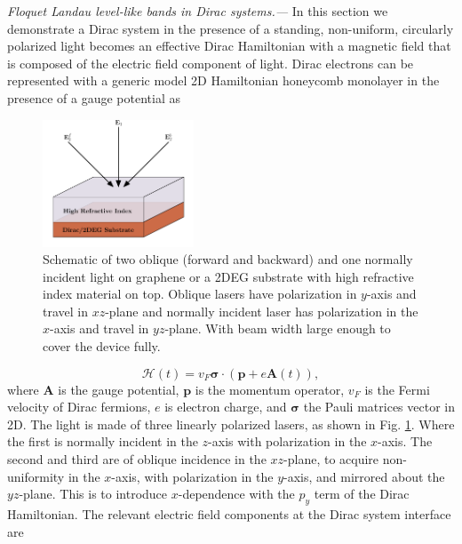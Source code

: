 \documentclass[aps,prb,twocolumn,showpacs,superscriptaddress]{revtex4-2}
\renewcommand{\vec}[1]{\mathbf{#1}}
\newcommand{\ham}{\mathcal{H}}
\begin{document}
\emph{Floquet Landau level-like bands in Dirac systems.---} In this section we demonstrate a Dirac system in the presence of a standing, non-uniform, circularly polarized light becomes an effective Dirac Hamiltonian with a magnetic field that is composed of the electric field component of light.
Dirac electrons can be represented with a generic model 2D Hamiltonian honeycomb monolayer in the presence of a gauge potential as

\begin{figure}[h]
  \includegraphics[width=0.4\textwidth]{./figures/fll-setup.pdf}
  \caption{Schematic of two oblique (forward and backward) and one normally incident light on graphene or a 2DEG substrate with high refractive index material on top. Oblique lasers have polarization in $y$-axis and travel in $xz$-plane and normally incident laser has polarization in the $x$-axis and travel in $yz$-plane. With beam width large enough to cover the device fully.}
  \label{fig:fll-setup}
\end{figure}

\begin{equation}\label{eq:HDirac}
  \ham(t) = v_{F} \bm{\sigma} \cdot \left(\vec{p} + e\vec{A}(t)\right),
\end{equation}
where $\vec{A}$ is the gauge potential, $\vec{p}$ is the momentum operator, $v_F$ is the Fermi velocity of Dirac fermions, $e$ is electron charge, and $\vec{\sigma}$ the Pauli matrices vector in 2D.
The light is made of three linearly polarized lasers, as shown in Fig. \ref{fig:fll-setup}.
Where the first is normally incident in the $z$-axis with polarization in the $x$-axis.
The second and third are of oblique incidence in the $xz$-plane, to acquire non-uniformity in the $x$-axis, with polarization in the $y$-axis, and mirrored about the $yz$-plane.
This is to introduce $x$-dependence with the $p_y$ term of the Dirac Hamiltonian.
The relevant electric field components at the Dirac system interface are
\end{document}
